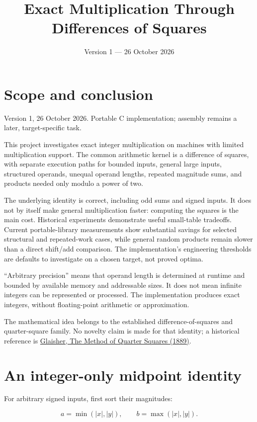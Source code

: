 \documentclass[11pt,a4paper]{article}
\title{Exact Multiplication Through Differences of Squares}
\author{}
\date{Version 1 --- 26 October 2026}
\begin{document}
\maketitle
\tableofcontents
\newpage

\section{Scope and conclusion}

Version 1, 26 October 2026. Portable C implementation; assembly remains a later, target-specific task.

This project investigates exact integer multiplication on machines with limited multiplication support. The common arithmetic kernel is a difference of squares, with separate execution paths for bounded inputs, general large inputs, structured operands, unequal operand lengths, repeated magnitude sums, and products needed only modulo a power of two.

The underlying identity is correct, including odd sums and signed inputs. It does not by itself make general multiplication faster: computing the squares is the main cost. Historical experiments demonstrate useful small-table tradeoffs. Current portable-library measurements show substantial savings for selected structural and repeated-work cases, while general random products remain slower than a direct shift/add comparison. The implementation's engineering thresholds are defaults to investigate on a chosen target, not proved optima.

``Arbitrary precision'' means that operand length is determined at runtime and bounded by available memory and addressable sizes. It does not mean infinite integers can be represented or processed. The implementation produces exact integers, without floating-point arithmetic or approximation.

The mathematical idea belongs to the established difference-of-squares and quarter-square family. No novelty claim is made for that identity; a historical reference is \href{\detokenize{https://www.nature.com/articles/040573c0}}{Glaisher, The Method of Quarter Squares (1889)}.

\section{An integer-only midpoint identity}

For arbitrary signed inputs, first sort their magnitudes:

\[
a=\min(|x|,|y|),\qquad b=\max(|x|,|y|).
\]
\end{document}
